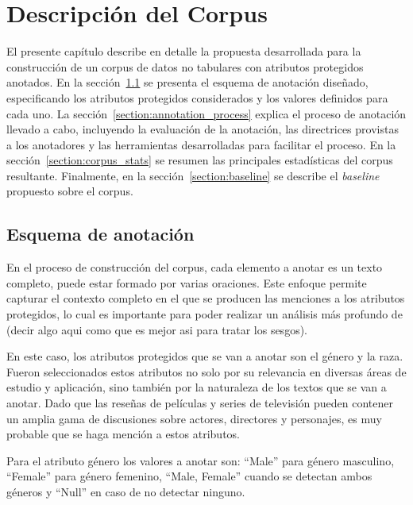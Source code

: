 \chapter{Descripci\'on del Corpus}\label{chapter:proposal}
El presente cap\'itulo describe en detalle la propuesta desarrollada para la construcci\'on de un corpus de datos no tabulares con 
atributos protegidos anotados. En la secci\'on~\ref{section:annotation_scheme} se presenta el esquema de 
anotaci\'on dise\~nado, especificando los atributos protegidos considerados y los valores definidos para cada uno. La
secci\'on~\ref{section:annotation_process} explica el proceso de anotaci\'on llevado a cabo, incluyendo la evaluaci\'on de 
la anotaci\'on, las directrices provistas a los anotadores y las herramientas desarrolladas para facilitar el proceso. En la
secci\'on~\ref{section:corpus_stats} se resumen las principales estad\'isticas del corpus resultante. Finalmente, en la 
secci\'on~\ref{section:baseline} se describe el \emph{baseline} propuesto sobre el corpus.

\section{Esquema de anotaci\'on}\label{section:annotation_scheme}
En el proceso de construcci\'on del corpus, cada elemento a anotar es un texto completo, puede estar formado por varias oraciones. 
Este enfoque permite capturar el contexto completo en el que se producen las menciones a los atributos protegidos, 
lo cual es importante para poder realizar un an\'alisis m\'as profundo de (decir algo aqui como que es mejor asi para tratar los sesgos).

En este caso, los atributos protegidos que se van a anotar son el g\'enero y la raza.
Fueron seleccionados estos atributos no solo por su relevancia en diversas \'areas de estudio y aplicaci\'on, sino tambi\'en 
por la naturaleza de los textos que se van a anotar. Dado que las rese\~nas de pel\'iculas y series de televisi\'on
pueden contener un amplia gama de discusiones sobre actores, directores y personajes, es muy probable que se haga menci\'on a 
estos atributos.

Para el atributo g\'enero los valores a anotar son: ``Male'' para g\'enero masculino, ``Female'' para g\'enero femenino, 
``Male, Female'' cuando se detectan ambos g\'eneros y ``Null'' en caso de no detectar ninguno.

